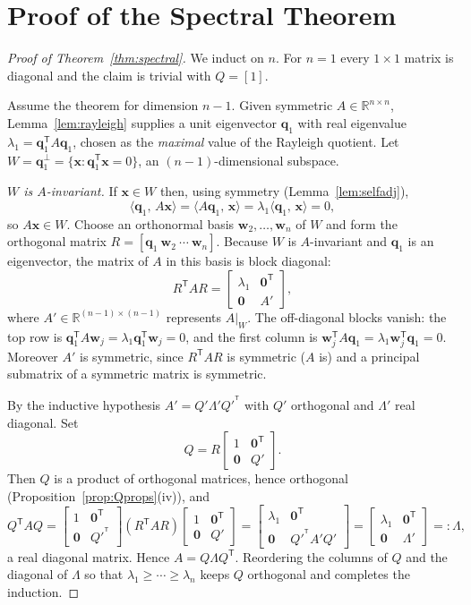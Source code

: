 \documentclass[11pt,oneside]{book}
\theoremstyle{plain}
\theoremstyle{definition}
\theoremstyle{remark}
\newcommand{\R}{\mathbb{R}}
\newcommand{\T}{^{\mathsf T}}
\newcommand{\inner}[2]{\langle #1,\, #2\rangle}
\newcommand{\bw}{\mathbf{w}}
\newcommand{\bx}{\mathbf{x}}
\newcommand{\bq}{\mathbf{q}}
\newcommand{\bzero}{\mathbf{0}}
\begin{document}
\section{Proof of the Spectral Theorem}

\begin{proof}[Proof of Theorem~\ref{thm:spectral}]
We induct on $n$. For $n=1$ every $1\times1$ matrix is diagonal and the claim is trivial
with $Q=[1]$.

Assume the theorem for dimension $n-1$. Given symmetric $A\in\R^{n\times n}$,
Lemma~\ref{lem:rayleigh} supplies a unit eigenvector $\bq_1$ with real eigenvalue
$\lambda_1=\bq_1\T A\bq_1$, chosen as the \emph{maximal} value of the Rayleigh quotient.
Let $W=\bq_1^\perp=\{\bx:\bq_1\T\bx=0\}$, an $(n-1)$-dimensional subspace.

\emph{$W$ is $A$-invariant.} If $\bx\in W$ then, using symmetry
(Lemma~\ref{lem:selfadj}),
\[
\inner{\bq_1}{A\bx}=\inner{A\bq_1}{\bx}=\lambda_1\inner{\bq_1}{\bx}=0,
\]
so $A\bx\in W$. Choose an orthonormal basis $\bw_2,\dots,\bw_n$ of $W$ and form the
orthogonal matrix $R=[\bq_1\ \bw_2\ \cdots\ \bw_n]$. Because $W$ is $A$-invariant and
$\bq_1$ is an eigenvector, the matrix of $A$ in this basis is block diagonal:
\[
R\T A R=\begin{bmatrix}\lambda_1 & \bzero\T\\ \bzero & A'\end{bmatrix},
\]
where $A'\in\R^{(n-1)\times(n-1)}$ represents $A|_W$. The off-diagonal blocks vanish:
the top row is $\bq_1\T A\bw_j=\lambda_1\bq_1\T\bw_j=0$, and the first column is
$\bw_j\T A\bq_1=\lambda_1\bw_j\T\bq_1=0$. Moreover $A'$ is symmetric, since
$R\T A R$ is symmetric ($A$ is) and a principal submatrix of a symmetric matrix is
symmetric.

By the inductive hypothesis $A'=Q'\Lambda'Q'^{\T}$ with $Q'$ orthogonal and $\Lambda'$
real diagonal. Set
\[
Q=R\begin{bmatrix}1 & \bzero\T\\ \bzero & Q'\end{bmatrix}.
\]
Then $Q$ is a product of orthogonal matrices, hence orthogonal
(Proposition~\ref{prop:Qprops}(iv)), and
\[
Q\T A Q=\begin{bmatrix}1&\bzero\T\\\bzero&Q'^{\T}\end{bmatrix}
(R\T A R)
\begin{bmatrix}1&\bzero\T\\\bzero&Q'\end{bmatrix}
=\begin{bmatrix}\lambda_1&\bzero\T\\\bzero&Q'^{\T}A'Q'\end{bmatrix}
=\begin{bmatrix}\lambda_1&\bzero\T\\\bzero&\Lambda'\end{bmatrix}=:\Lambda,
\]
a real diagonal matrix. Hence $A=Q\Lambda Q\T$. Reordering the columns of $Q$ and the
diagonal of $\Lambda$ so that $\lambda_1\ge\cdots\ge\lambda_n$ keeps $Q$ orthogonal and
completes the induction.
\end{proof}
\end{document}
